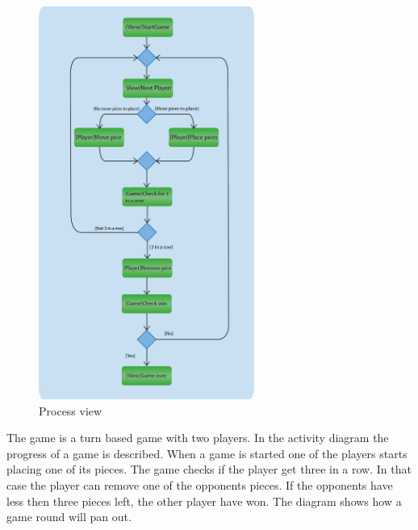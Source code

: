 \begin{figure}[H]
\begin{center}
\includegraphics[width=200pt]{./Images/ProcessView.png}
\end{center}
\caption{Process view}
\end{figure}

The game is a turn based game with two players. In the activity diagram the progress of a game is described. When a game is started one of the players starts placing one of its pieces. The game checks if the player get three in a row. In that case the player can remove one of the opponents pieces. If the opponents have less then three pieces left, the other player have won. The diagram shows how a game round will pan out. 




